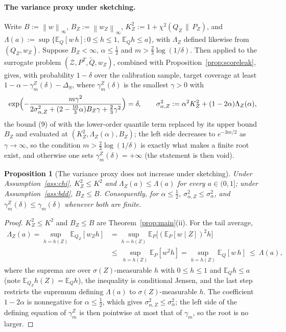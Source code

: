 \documentclass[11pt,a4paper]{article}
\newcommand{\chisqZ}{\chi^2(Q_Z\,\|\,P_Z)}
\newcommand{\norm}[1]{\left\|#1\right\|}
\newcommand{\E}{\mathbb{E}}
\newcommand{\Zc}{\mathcal Z}
\newcommand{\Qt}{\widetilde Q}
\theoremstyle{plain}
\newtheorem{proposition}[theorem]{Proposition}
\theoremstyle{definition}
\theoremstyle{remark}
\begin{document}
\paragraph{The variance proxy under sketching.}
Write $B:=\norm{w}_\infty$, $B_Z:=\norm{w_Z}_\infty$, $K_Z^2:=1+\chisqZ$, and $\Lambda(a):=\sup\{\E_Q[w\,h]:0\le h\le1,\ \E_Qh\le a\}$, with $\Lambda_Z$ defined likewise from $(Q_Z,w_Z)$. Suppose $B_Z<\infty$, $\alpha\le\tfrac12$ and $m>\tfrac23\log(1/\delta)$. Then \cite[Thm.\ 1]{pournaderi2026} applied to the surrogate problem $(\Zc,P^T,\Qt,w_Z)$, combined with Proposition~\ref{prop:scoreleak}, gives, with probability $1-\delta$ over the calibration sample, target coverage at least $1-\alpha-\gamma^Z_m(\delta)-\Delta_S$, where $\gamma^Z_m(\delta)$ is the smallest $\gamma>0$ with
\[
\exp\Bigl(-\frac{m\gamma^2}{2\sigma^2_{\alpha,Z}+(2-\tfrac{10}{3}\alpha)B_Z\gamma+\tfrac23\gamma^2}\Bigr)=\delta,
\qquad \sigma^2_{\alpha,Z}:=\alpha^2K_Z^2+(1-2\alpha)\Lambda_Z(\alpha),
\]
the bound (9) of \cite{pournaderi2026} with the lower-order quantile term replaced by its upper bound $B_Z$ and evaluated at $(K_Z^2,\Lambda_Z(\alpha),B_Z)$; the left side decreases to $e^{-3m/2}$ as $\gamma\to\infty$, so the condition $m>\tfrac23\log(1/\delta)$ is exactly what makes a finite root exist, and otherwise one sets $\gamma^Z_m(\delta)=+\infty$ (the statement is then void).

\begin{proposition}[The variance proxy does not increase under sketching]\label{prop:proxy}
Under Assumption~\ref{ass:chi}, $K_Z^2\le K^2$ and $\Lambda_Z(a)\le\Lambda(a)$ for every $a\in(0,1]$; under Assumption~\ref{ass:bdd}, $B_Z\le B$. Consequently, for $\alpha\le\tfrac12$, $\sigma^2_{\alpha,Z}\le\sigma^2_\alpha$, and $\gamma^Z_m(\delta)\le\gamma_m(\delta)$ whenever both are finite.
\end{proposition}
\begin{proof}
$K_Z^2\le K^2$ and $B_Z\le B$ are Theorem~\ref{prop:main}(ii). For the tail average,
\begin{align*}
\Lambda_Z(a)=\sup_{h=h(Z)}\E_{Q_Z}[w_Z h]&=\sup_{h=h(Z)}\E_P\bigl[(\E_P[w\mid Z])^2h\bigr]\\
&\le\ \sup_{h=h(Z)}\E_P[w^2h]=\sup_{h=h(Z)}\E_Q[w\,h]\ \le\ \Lambda(a),
\end{align*}
where the suprema are over $\sigma(Z)$-measurable $h$ with $0\le h\le1$ and $\E_{Q}h\le a$ (note $\E_{Q_Z}h(Z)=\E_Qh$), the inequality is conditional Jensen, and the last step restricts the supremum defining $\Lambda(a)$ to $\sigma(Z)$-measurable $h$. The coefficient $1-2\alpha$ is nonnegative for $\alpha\le\tfrac12$, which gives $\sigma^2_{\alpha,Z}\le\sigma^2_\alpha$; the left side of the defining equation of $\gamma^Z_m$ is then pointwise at most that of $\gamma_m$, so the root is no larger.
\end{proof}
\end{document}
